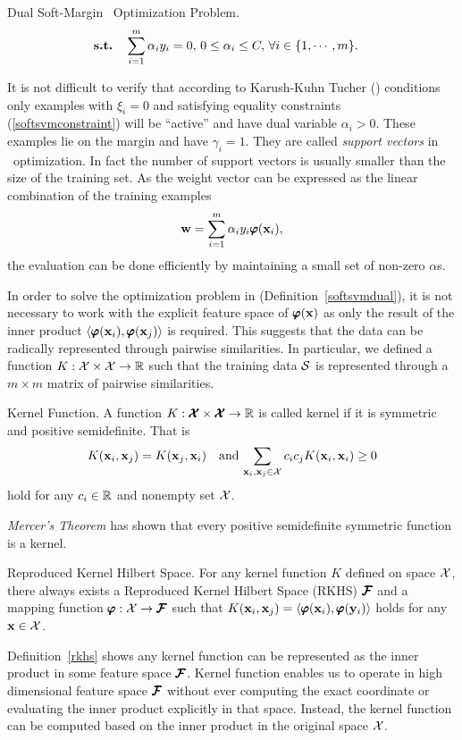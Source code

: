{\begin{definition}{Dual Soft-Margin \svm\ Optimization Problem.}
\begin{align*}
		\textbf{s.t.} & \quad \sum_{i=1}^{m}\alpha_iy_i=0, \, 0\le\alpha_i\le C, \, \forall i\in\{1,\cdots,m\}.
	\end{align*}
\end{definition}
It is not difficult to verify that according to Karush-Kuhn Tucher (\kkt) conditions only examples with $\xi_i=0$ and satisfying equality constraints (\ref{softsvmconstraint}) will be ``active'' and have dual variable $\alpha_i>0$.
These examples lie on the margin and have $\gamma_i=1$.
They are called \textit{support vectors} in \svm\ optimization.
In fact the number of support vectors is usually smaller than the size of the training set.
As the weight vector can be expressed as the linear combination of the training examples \citep{taylor04}
\begin{align*}
	\mathbf {w} = \sum_{i=1}^{m}\alpha_iy_i\pmb \varphi(\mathbf {x}_i),
\end{align*}
the evaluation can be done efficiently by maintaining a small set of non-zero $\alpha$s.

In order to solve the optimization problem in (Definition~\ref{softsvmdual}), it is not necessary to work with the explicit feature space of $\pmb \varphi(\mathbf {x})$ as only the result of the inner product $\langle \pmb \varphi(\mathbf {x}_i), \pmb \varphi(\mathbf {x}_j) \rangle$ is required.
This suggests that the data can be radically represented through pairwise similarities.
In particular, we defined a function $K:\mathcal{X}\times\mathcal{X}\rightarrow\mathbb{R}$ such that the training data $\mathcal{S}$ is represented through a $m\times m$ matrix of pairwise similarities.
\begin{definition}{Kernel Function.}
 	A function $K:\pmb {\mathcal{X}}\times\pmb {\mathcal{X}}\rightarrow\mathbb{R}$ is called kernel if it is symmetric and positive semidefinite. That is 
\begin{align*}
	K(\mathbf {x}_i,\mathbf {x}_j) = K(\mathbf {x}_j,\mathbf {x}_i)\quad \text{and}\, \sum_{\mathbf {x}_i,\mathbf {x}_j\in\mathcal{X}}c_ic_jK(\mathbf {x}_i,\mathbf {x}_i)\ge0
\end{align*}
hold for any $c_i\in\mathbb{R}$ and nonempty set $\mathcal{X}$.
\end{definition}
\textit{Mercer's Theorem} \citep{taylor04} has shown that every positive semidefinite symmetric function is a kernel.
\begin{definition}{Reproduced Kernel Hilbert Space.} \label{rkhs}
	For any kernel function $K$ defined on space $\mathcal{X}$, there always exists a Reproduced Kernel Hilbert Space (RKHS) $\pmb {\mathcal{F}}$ and a mapping function $\pmb \varphi:\mathcal{X}\rightarrow\pmb {\mathcal{F}}$ such that $K(\mathbf {x}_i,\mathbf {x}_j)=\langle \pmb \varphi(\mathbf {x}_i), \pmb \varphi(\mathbf {y}_i) \rangle$ holds for any $\mathbf {x}\in\mathcal{X}$.
\end{definition}
Definition~\ref{rkhs} shows any kernel function can be represented as the inner product in some feature space $\pmb {\mathcal{F}}$.
Kernel function enables us to operate in high dimensional feature space $\pmb {\mathcal{F}}$ without ever computing the exact coordinate or evaluating the inner product explicitly in that space.
Instead, the kernel function can be computed based on the inner product in the original space $\mathcal{X}$.

}
